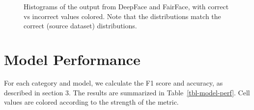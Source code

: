 \documentclass[
  letterpaper,
  DIV=11,
  numbers=noendperiod]{scrreprt}
\begin{document}
\begin{figure}
\begin{minipage}[t]{0.50\linewidth}
{}

\end{minipage}%
\newline
\begin{minipage}[t]{0.50\linewidth}

{\centering 


}

\end{minipage}%

\caption{\label{fig-output-hists}Histograms of the output from DeepFace
and FairFace, with correct vs incorrect values colored. Note that the
distributions match the correct (source dataset) distributions.}

\end{figure}

\hypertarget{model-performance}{%
\section{Model Performance}\label{model-performance}}

For each category and model, we calculate the F1 score and accuracy, as
described in section 3. The results are summarized in
Table~\ref{tbl-model-perf}. Cell values are colored according to the
strength of the metric.
\end{document}
